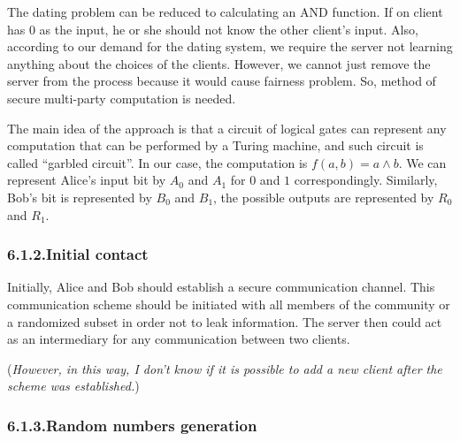 \documentclass{article}
\begin{document}
\noindent{}The dating problem can be reduced to calculating an AND function. If on client has 0 as the input, he or she should not know the other client’s input. Also, according to our demand for the dating system, we require the server not learning anything about the choices of the clients. However, we cannot just remove the server from the process because it would cause fairness problem. So, method of secure multi-party computation is needed.%

The main idea of the approach is that a circuit of logical gates can represent any computation that can be performed by a Turing machine, and such circuit is called “garbled circuit”. In our case, the computation is $f(a, b) = a \land b$. We can represent Alice’s input bit by $A_{0}$ and $A_{1}$ for $0$ and $1$ correspondingly. Similarly, Bob’s bit is represented by $B_{0}$ and $B_{1}$, the possible outputs are represented by $R_{0}$ and $R_{1}$.%

\subsubsection{6.1.2.\hspace*{0.5em}Initial contact}\label{sec-initial-contact}%

\noindent{}Initially, Alice and Bob should establish a secure communication channel. This communication scheme should be initiated with all members of the community or a randomized subset in order not to leak information. The server then could act as an intermediary for any communication between two clients.%

(\emph{However, in this way, I don't know if it is possible to add a new client after the scheme was established.})%

\subsubsection{6.1.3.\hspace*{0.5em}Random numbers generation}\label{sec-random-numbers-generation}%
\end{document}
